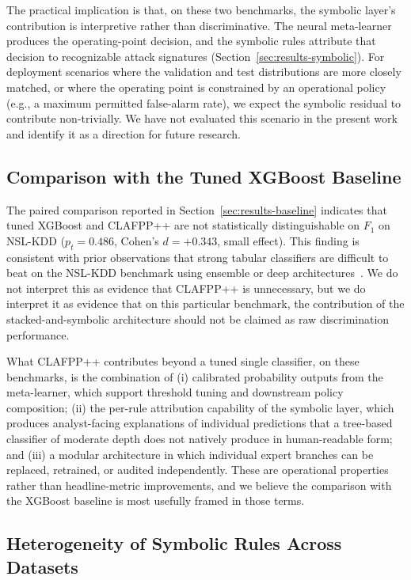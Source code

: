 \documentclass[pdflatex,sn-mathphys-num]{sn-jnl}
\theoremstyle{thmstyleone}
\theoremstyle{thmstyletwo}
\theoremstyle{thmstylethree}
\begin{document}
The practical implication is that, on these two benchmarks, the symbolic layer's contribution is interpretive rather than discriminative. The neural meta-learner produces the operating-point decision, and the symbolic rules attribute that decision to recognizable attack signatures (Section~\ref{sec:results-symbolic}). For deployment scenarios where the validation and test distributions are more closely matched, or where the operating point is constrained by an operational policy (e.g., a maximum permitted false-alarm rate), we expect the symbolic residual to contribute non-trivially. We have not evaluated this scenario in the present work and identify it as a direction for future research.

\subsection{Comparison with the Tuned XGBoost Baseline}\label{sec:disc-xgb}

The paired comparison reported in Section~\ref{sec:results-baseline} indicates that tuned XGBoost and CLAFPP++ are not statistically distinguishable on $F_1$ on NSL-KDD ($p_t = 0.486$, Cohen's $d = +0.343$, small effect). This finding is consistent with prior observations that strong tabular classifiers are difficult to beat on the NSL-KDD benchmark using ensemble or deep architectures~\cite{mills2024hybrid,ahmad2024automl}. We do not interpret this as evidence that CLAFPP++ is unnecessary, but we do interpret it as evidence that on this particular benchmark, the contribution of the stacked-and-symbolic architecture should not be claimed as raw discrimination performance.

What CLAFPP++ contributes beyond a tuned single classifier, on these benchmarks, is the combination of (i) calibrated probability outputs from the meta-learner, which support threshold tuning and downstream policy composition; (ii) the per-rule attribution capability of the symbolic layer, which produces analyst-facing explanations of individual predictions that a tree-based classifier of moderate depth does not natively produce in human-readable form; and (iii) a modular architecture in which individual expert branches can be replaced, retrained, or audited independently. These are operational properties rather than headline-metric improvements, and we believe the comparison with the XGBoost baseline is most usefully framed in those terms.

\subsection{Heterogeneity of Symbolic Rules Across Datasets}\label{sec:disc-rules}
\end{document}
